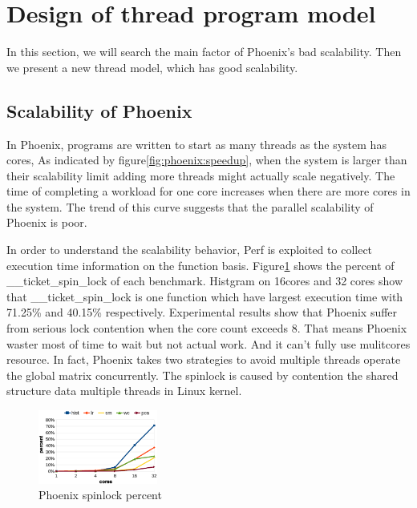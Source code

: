 \section{Design of thread program model}
{\color{red}In this section, we will search the main factor of Phoenix's bad scalability.
Then we present a new thread model, which has good scalability.
}


\subsection{Scalability of Phoenix}
In Phoenix, programs are written to start as many threads as the system has cores,
As indicated by figure\ref{fig:phoenix:speedup}, 
when the system is larger than their scalability limit 
adding more threads might actually scale negatively.
The time of completing a workload for one core increases 
when there are more cores in the system. 
The trend of this curve suggests that
the parallel scalability of Phoenix is poor.

In order to understand the scalability behavior, 
Perf\cite{} is exploited to collect execution time information
on the function basis. 
Figure\ref{fig:phoenix:spinlock} shows the percent of \_\_ticket\_spin\_lock of each benchmark.
Histgram on 16cores and 32 cores
show that \_\_ticket\_spin\_lock is one function 
which have largest execution time with 71.25\% and 40.15\% respectively. 
Experimental results show that Phoenix suffer from serious lock contention
when the core count exceeds 8.
That means Phoenix waster most of time to wait but not actual work.
And it can't fully use mulitcores resource.
In fact, Phoenix takes two strategies to avoid multiple threads operate the global matrix concurrently.
The spinlock is caused by contention the shared structure data multiple threads in Linux kernel.
\begin{figure}[!h!t]  
    \centering
    \includegraphics[width=0.35\textwidth]{eps/phoenix_spinlock.eps}
    \caption{Phoenix spinlock percent}
    \label{fig:phoenix:spinlock}
\end{figure}


